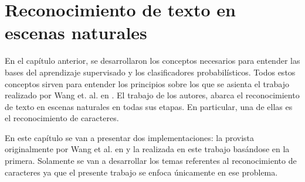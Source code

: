 \newpage	
\section{Reconocimiento de texto en escenas naturales}

	En el capítulo anterior, se desarrollaron los conceptos necesarios para entender las bases del aprendizaje supervisado y los clasificadores probabilísticos. Todos estos conceptos sirven para entender los principios sobre los que se asienta el trabajo realizado por Wang et. al. en \cite{wang}. El trabajo de los autores, abarca el reconocimiento de texto en escenas naturales en todas sus etapas. En particular, una de ellas es el reconocimiento de caracteres.
	
	En este capítulo se van a presentar dos implementaciones: la provista originalmente por Wang et al. en \cite{wang} y la realizada en este trabajo basándose en la primera. Solamente se van a desarrollar los temas referentes al reconocimiento de caracteres ya que el presente trabajo se enfoca únicamente en ese problema.
	
	
		
	
	
	
	
	
	
